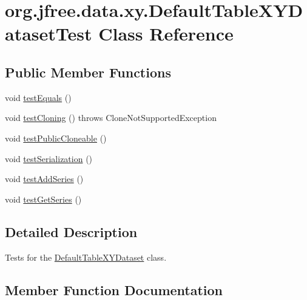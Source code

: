 \hypertarget{classorg_1_1jfree_1_1data_1_1xy_1_1_default_table_x_y_dataset_test}{}\section{org.\+jfree.\+data.\+xy.\+Default\+Table\+X\+Y\+Dataset\+Test Class Reference}
\label{classorg_1_1jfree_1_1data_1_1xy_1_1_default_table_x_y_dataset_test}
\subsection*{Public Member Functions}
\begin{DoxyCompactItemize}
\item 
void \mbox{\hyperlink{classorg_1_1jfree_1_1data_1_1xy_1_1_default_table_x_y_dataset_test_ae678f87496f5da41e268ab65fdaa987c}{test\+Equals}} ()
\item 
void \mbox{\hyperlink{classorg_1_1jfree_1_1data_1_1xy_1_1_default_table_x_y_dataset_test_a51323033e74c252c6b243cacd8c976b5}{test\+Cloning}} ()  throws Clone\+Not\+Supported\+Exception 
\item 
void \mbox{\hyperlink{classorg_1_1jfree_1_1data_1_1xy_1_1_default_table_x_y_dataset_test_a6d187c6f9ce2d8ed5f6a8e8900e4ceb7}{test\+Public\+Cloneable}} ()
\item 
void \mbox{\hyperlink{classorg_1_1jfree_1_1data_1_1xy_1_1_default_table_x_y_dataset_test_a61ae789c2aaf2e710e20115ab93e370b}{test\+Serialization}} ()
\item 
void \mbox{\hyperlink{classorg_1_1jfree_1_1data_1_1xy_1_1_default_table_x_y_dataset_test_af68ca5becc382a9233cbdcac52ab3006}{test\+Add\+Series}} ()
\item 
void \mbox{\hyperlink{classorg_1_1jfree_1_1data_1_1xy_1_1_default_table_x_y_dataset_test_adef9c4bc2fb56807e3d7019887165628}{test\+Get\+Series}} ()
\end{DoxyCompactItemize}


\subsection{Detailed Description}
Tests for the \mbox{\hyperlink{classorg_1_1jfree_1_1data_1_1xy_1_1_default_table_x_y_dataset}{Default\+Table\+X\+Y\+Dataset}} class. 

\subsection{Member Function Documentation}
\mbox{\label{classorg_1_1jfree_1_1data_1_1xy_1_1_default_table_x_y_dataset_test_af68ca5becc382a9233cbdcac52ab3006}} 
